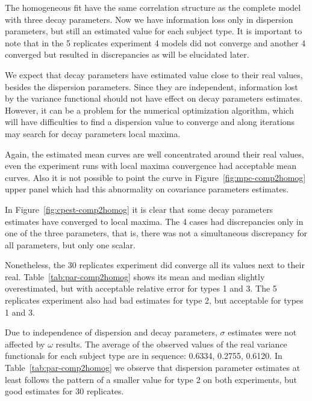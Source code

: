 The homogeneous fit have the same correlation structure as the complete model with three decay parameters. Now we have information loss only in dispersion parameters, but still an estimated value for each subject type. It is important to note that in the 5 replicates experiment 4 models did not converge and another 4 converged but resulted in discrepancies as will be elucidated later.

We expect that decay parameters have estimated value close to their real values, besides the dispersion parameters. Since they are independent, information lost by the variance functional should not have effect on decay parameters estimates. However, it can be a problem for the numerical optimization algorithm, which will have difficulties to find a dispersion value to converge and along iterations may search for decay parameters local maxima.

Again, the estimated mean curves are well concentrated around their real values, even the experiment runs with local maxima convergence had acceptable mean curves. Also it is not possible to  point the curve in Figure~\ref{fig:mpc-comp2homog} upper panel which had this abnormality on covariance parameters estimates.

In Figure~\ref{fig:cpest-comp2homog} it is clear that some decay parameters estimates have converged to local maxima. The 4 cases had discrepancies only in one of the three parameters, that is, there was not a simultaneous discrepancy for all parameters, but only one scalar.

Nonetheless, the 30 replicates experiment did converge all its values next to their real. Table~\ref{tab:par-comp2homog} shows its mean and median slightly overestimated, but with acceptable relative error for types 1 and 3. The 5 replicates experiment also had bad estimates for type 2, but acceptable for types 1 and 3. 

Due to independence of dispersion and decay parameters, $\sigma$ estimates were not affected by $\omega$ results. The average of the observed values of the real variance functionals for each subject type are in sequence: 0.6334, 0.2755, 0.6120. In Table~\ref{tab:par-comp2homog} we observe that dispersion parameter estimates at least follows the pattern of a smaller value for type 2 on both experiments, but good estimates for 30 replicates. 


